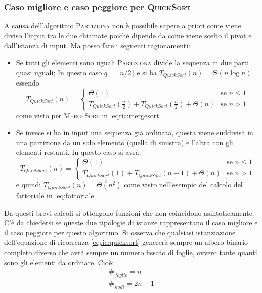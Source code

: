 \subsubsection{Caso migliore e caso peggiore per \textsc{QuickSort}}
A causa dell'algoritmo \textsc{Partiziona} non è possibile sapere a priori come viene diviso l’input tra le due chiamate poiché dipende da come
viene scelto il pivot e dall’istanza di input. Ma posso fare i seguenti ragionamenti:
\begin{itemize}
	\item Se tutti gli elementi sono uguali \textsc{Partiziona} divide la sequenza in due parti quasi uguali;
	In questo caso $q= \lfloor n/2 \rfloor$ e si ha $T_{QuickSort}(n)=\Theta(n \log n)$ essendo
	\begin{equation}\label{eqric:istanza1qs}
		T_{QuickSort}(n)=
		\left \{
		\begin{array}{lc}
			\Theta(1) & \mbox{se } n \leq 1 \\
			T_{QuickSort}(\frac{n}{2})+ T_{QuickSort}(\frac{n}{2}) + \Theta(n) & \mbox{se } n >1
		\end{array}
		\right.
	\end{equation}
	come visto per \textsc{MergeSort} in \ref{eqric:mergesort}.
	\item Se invece si ha in input una sequenza già ordinata, questa viene suddivisa in una partizione da un solo elemento (quella di sinistra) e l'altra con gli elementi restanti.
	In questo caso si avrà:
	\begin{equation}\label{eqric:istanza2qs}
		T_{QuickSort}(n)=
		\left \{
		\begin{array}{lc}
			\Theta(1) & \mbox{se } n \leq 1 \\
			T_{QuickSort}(1)+ T_{QuickSort}(n-1) + \Theta(n) & \mbox{se } n >1
		\end{array}
		\right.
	\end{equation}
	e quindi $T_{QuickSort}(n)= \Theta(n^{2})$ come visto nell'esempio del calcolo del fattoriale in \ref{eq:fattoriale}.
\end{itemize}

Da questi brevi calcoli si ottengono funzioni che non coincidono asintoticamente. C'è da chiedersi se queste due tipologie di istanze rappresentano il caso migliore e il caso peggiore per questo algoritmo. Si osserva che qualsiasi istanziazione dell'equazione di ricorrenza \ref{eqric:quicksort} genererà sempre un albero binario completo diverso che avrà sempre un numero fissato di foglie, ovvero tante quanti sono gli elementi da ordinare. Cioè:
\begin{displaymath}
	\begin{array}{lc}
		\#_{foglie}=n \\
		\#_{nodi}=2n-1
	\end{array}
\end{displaymath}

